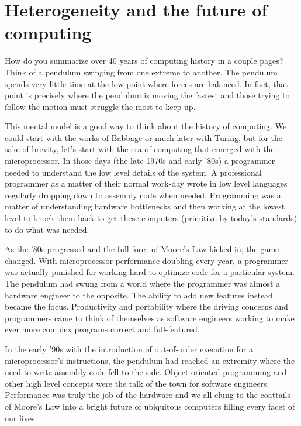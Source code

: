 
\def\ArtDir{01.HeteroComp/figures}%

\chapter{Heterogeneity and the future of computing}
\label{chapter:heterogeneity}

How do you summarize over 40 years of computing history in a couple pages?   
Think of a pendulum swinging from one extreme to another.  The pendulum spends very little time at
the low-point where forces are balanced.  In fact, that point is precisely where the pendulum is
moving the fastest and those trying to follow the motion must struggle the most  to keep up.

This mental model is a good way to think about the history of computing.  We could start with the
works of Babbage or much later with Turing, but for the sake of brevity, let's start with the era of computing
that emerged with the microprocessor.  In those days (the late 1970s and early '80s) a programmer
needed to understand the low level details of the system.  A professional programmer as a matter
of their normal work-day wrote in low level languages regularly dropping down to assembly code 
when needed.   Programming was a matter of understanding hardware bottlenecks and then working at the lowest 
level to knock them back to get these computers (primitive by today's standards) to do what was needed.

As the '80s progressed and the full force of Moore's Law kicked in, the game changed.   With
microprocessor performance doubling every year, a programmer was actually punished for 
working hard to optimize code for a particular system.  The pendulum had swung from
a world where the programmer was almost a hardware engineer to the opposite.  The ability to 
add new features instead became the focus.  Productivity and portability where the driving concerns and
programmers came to think of themselves as software engineers working to make ever more
complex programs correct and full-featured.

In the early '90s with the introduction of out-of-order execution for a microprocessor's instructions, the 
pendulum had reached an extremity where the need to write assembly code fell to the side.  Object-oriented
programming and other high level concepts were the talk of the town for software engineers.  Performance was
truly the job of the hardware and we all clung to the coattails of Moore's Law into a bright future of
ubiquitous computers filling every facet of our lives.

